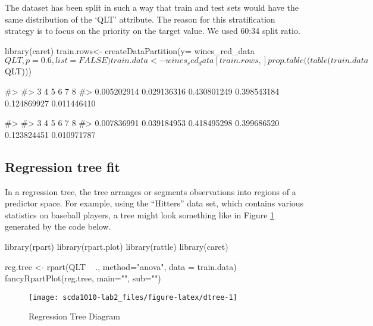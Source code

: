 The dataset has been split in such a way that train and test sets would
have the same distribution of the `QLT' attribute. The reason for this
stratification strategy is to focus on the priority on the target value.
We used 60:34 split ratio.

\begin{Schunk}
\begin{Sinput}
library(caret)
train.rows<- createDataPartition(y= wines_red_data$QLT, p=0.6, list = FALSE)
train.data<- wines_red_data[train.rows,]
prop.table((table(train.data$QLT)))
\end{Sinput}
\begin{Soutput}
#> 
#>           3           4           5           6           7           8 
#> 0.005202914 0.029136316 0.430801249 0.398543184 0.124869927 0.011446410
\end{Soutput}
\end{Schunk}

\begin{Schunk}
\begin{Soutput}
#> 
#>           3           4           5           6           7           8 
#> 0.007836991 0.039184953 0.418495298 0.399686520 0.123824451 0.010971787
\end{Soutput}
\end{Schunk}

\hypertarget{regression-tree-fit}{%
\subsection{Regression tree fit}\label{regression-tree-fit}}

In a regression tree, the tree arranges or segments observations into
regions of a predictor space. For example, using the ``Hitters'' data
set, which contains various statistics on baseball players, a tree might
look something like in Figure \ref{fig:dtree} generated by the code
below.

\begin{Schunk}
\begin{Sinput}
library(rpart)
library(rpart.plot)
library(rattle)
library(caret)

reg.tree <- rpart(QLT ~ ., method="anova", data = train.data)
fancyRpartPlot(reg.tree, main="", sub="")
\end{Sinput}
\begin{figure}[h]

{\centering \texttt{[image: scda1010-lab2\_files/figure-latex/dtree-1]} 

}

\caption[Regression Tree Diagram]{Regression Tree Diagram}\label{fig:dtree}
\end{figure}
\end{Schunk}

